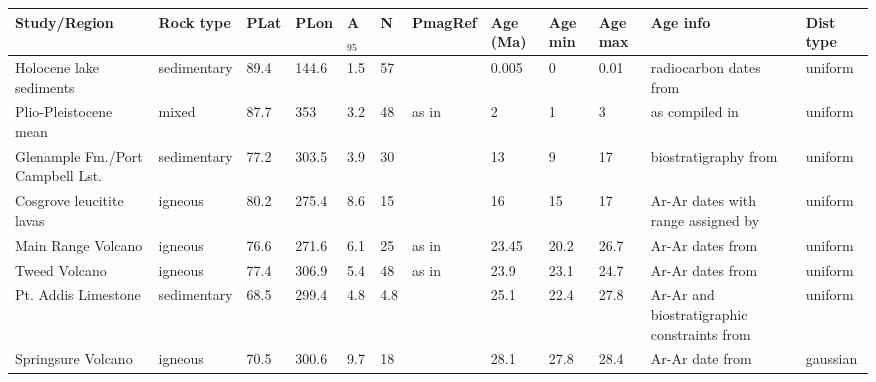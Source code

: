 \documentclass[11pt,letterpaper]{article}
\begin{document}
\begin{table}
\scriptsize
\begin{tabular}{p{2.5 cm}lllllp{2.5 cm}lllp{3 cm}l}
\hline
Study/Region & Rock type & PLat & PLon & A$_{95}$ & N   & PmagRef & Age (Ma) & Age min & Age max & Age info & Dist type \\
\hline
Holocene lake sediments          & sedimentary & 89.4 & 144.6 & 1.5 & 57  & \cite{Idnurm1985a}                & 0.005      & 0        & 0.01     & radiocarbon dates from \cite{Idnurm1985a}                                    & uniform           \\
Plio-Pleistocene mean            & mixed       & 87.7 & 353   & 3.2 & 48  & as in \cite{Hansma2019a} & 2          & 1        & 3                 & as compiled in \cite{Hansma2019a}                                            & uniform           \\
Glenample Fm./Port Campbell Lst. & sedimentary & 77.2 & 303.5 & 3.9 & 30  & \cite{Idnurm1985a}                & 13         & 9        & 17       & biostratigraphy from \cite{Dickinson2002a}                                   & uniform           \\
Cosgrove leucitite lavas         & igneous     & 80.2 & 275.4 & 8.6 & 15  & \cite{Hansma2018a}                & 16         & 15       & 17       & Ar-Ar dates with range assigned by \cite{Hansma2018a}                        & uniform           \\
Main Range Volcano               & igneous     & 76.6 & 271.6 & 6.1 & 25  & as in \cite{Hansma2019a} & 23.45      & 20.2     & 26.7              & Ar-Ar dates from \cite{Knesel2008a}                                          & uniform           \\
Tweed Volcano                    & igneous     & 77.4 & 306.9 & 5.4 & 48  & as in \cite{Hansma2019a} & 23.9       & 23.1     & 24.7              & Ar-Ar dates from \cite{Knesel2008a}                                          & uniform           \\
Pt. Addis Limestone              & sedimentary & 68.5 & 299.4 & 4.8 & 4.8 & \cite{Idnurm1985a}                & 25.1       & 22.4     & 27.8     & Ar-Ar and biostratigraphic constraints from \cite{Idnurm1985a, McLaren2009a} & uniform           \\
Springsure Volcano               & igneous     & 70.5 & 300.6 & 9.7 & 18  & \cite{Hansma2019a}                & 28.1       & 27.8     & 28.4     & Ar-Ar date from \cite{Cohen2013a}                                            & gaussian          \\

\end{tabular}
\end{table}
\end{document}
